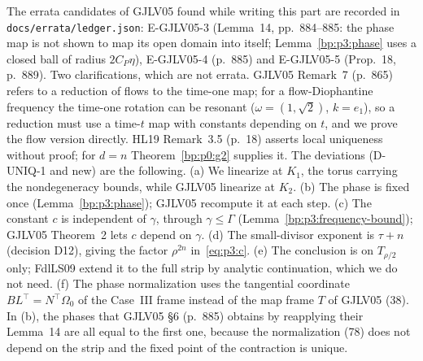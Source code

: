 \begin{remark}\label{bp:p3:deviations}
The errata candidates of GJLV05 found while writing this part are recorded in
\texttt{docs/errata/ledger.json}: E-GJLV05-3 (Lemma~14, pp.~884--885: the phase map is not shown to map
its open domain into itself; Lemma~\ref{bp:p3:phase} uses a closed ball of radius $2C_P\eta$),
E-GJLV05-4 (p.~885) and E-GJLV05-5 (Prop.~18, p.~889). Two clarifications, which are not errata. GJLV05
Remark~7 (p.~865) refers to a reduction of flows to the time-one map; for a flow-Diophantine frequency
the time-one rotation can be resonant ($\omega=(1,\sqrt2)$, $k=e_1$), so a reduction must use a time-$t$
map with constants depending on $t$, and we prove the flow version directly. HL19 Remark~3.5 (p.~18)
asserts local uniqueness without proof; for $d=n$ Theorem~\ref{bp:p0:g2} supplies it. The deviations
(D-UNIQ-1 and new) are the following.
(a) We linearize at $K_1$, the torus carrying the
nondegeneracy bounds, while GJLV05 linearize at $K_2$. (b) The phase is fixed once
(Lemma~\ref{bp:p3:phase}); GJLV05 recompute it at each step. (c) The constant $c$ is independent of
$\gamma$, through $\gamma\le\Gamma$ (Lemma~\ref{bp:p3:frequency-bound}); GJLV05 Theorem~2 lets $c$
depend on $\gamma$. (d) The small-divisor exponent is $\tau+n$ (decision D12), giving the factor
$\rho^{2n}$ in~\eqref{eq:p3:c}. (e) The conclusion is on $T_{\rho/2}$ only; FdlLS09 extend it to the
full strip by analytic continuation, which we do not need. (f) The phase normalization uses the
tangential coordinate $BL^\top=N^\top\Omega_0$ of the Case~III frame instead of the map frame $T$ of
GJLV05 (38).
In (b), the phases that GJLV05 \S6 (p.~885) obtains by reapplying their Lemma~14 are all equal to the
first one, because the normalization (78) does not depend on the strip and the fixed point of the
contraction is unique.
\end{remark}
